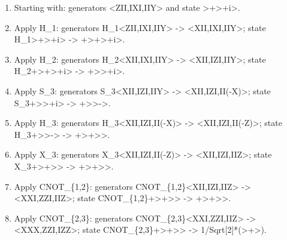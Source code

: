 \documentclass[11pt]{article}
\providecommand{\tightlist}{%
      \setlength{\itemsep}{0pt}\setlength{\parskip}{0pt}}
\begin{document}
    \begin{enumerate}
\def\labelenumi{\arabic{enumi}.}
\tightlist
\item
  Starting with: generators \textless ZII,IXI,IIY\textgreater{} and
  state
  \textgreater\textbar+\textgreater\textbar+i\textgreater.
\item
  Apply H\_1: generators H\_1\textless ZII,IXI,IIY\textgreater{}
  -\textgreater{} \textless XII,IXI,IIY\textgreater; state
  H\_1\textgreater\textbar+\textgreater\textbar+i\textgreater{}
  -\textgreater{}
  \textbar+\textgreater\textbar+\textgreater\textbar+i\textgreater.
\item
  Apply H\_2: generators H\_2\textless XII,IXI,IIY\textgreater{}
  -\textgreater{} \textless XII,IZI,IIY\textgreater; state
  H\_2\textbar+\textgreater\textbar+\textgreater\textbar+i\textgreater{}
  -\textgreater{}
  \textbar+\textgreater{}\textgreater\textbar+i\textgreater.
\item
  Apply S\_3: generators S\_3\textless XII,IZI,IIY\textgreater{}
  -\textgreater{} \textless XII,IZI,II(-X)\textgreater; state
  S\_3\textbar+\textgreater{}\textgreater\textbar+i\textgreater{}
  -\textgreater{}
  \textbar+\textgreater{}\textgreater\textbar-\textgreater.
\item
  Apply H\_3: generators H\_3\textless XII,IZI,II(-X)\textgreater{}
  -\textgreater{} \textless XII,IZI,II(-Z)\textgreater; state
  H\_3\textbar+\textgreater{}\textgreater\textbar-\textgreater{}
  -\textgreater{}
  \textbar+\textgreater\textbar+\textgreater{}\textgreater.
\item
  Apply X\_3: generators X\_3\textless XII,IZI,II(-Z)\textgreater{}
  -\textgreater{} \textless XII,IZI,IIZ\textgreater; state
  X\_3\textbar+\textgreater\textbar+\textgreater{}\textgreater{}
  -\textgreater{}
  \textbar+\textgreater\textbar+\textgreater{}\textgreater.
\item
  Apply CNOT\_\{1,2\}: generators
  CNOT\_\{1,2\}\textless XII,IZI,IIZ\textgreater{} -\textgreater{}
  \textless XXI,ZZI,IIZ\textgreater; state
  CNOT\_\{1,2\}\textbar+\textgreater\textbar+\textgreater{}\textgreater{}
  -\textgreater{}
  \textbar+\textgreater\textbar+\textgreater{}\textgreater.
\item
  Apply CNOT\_\{2,3\}: generators
  CNOT\_\{2,3\}\textless XXI,ZZI,IIZ\textgreater{} -\textgreater{}
  \textless XXX,ZZI,IZZ\textgreater; state
  CNOT\_\{2,3\}\textbar+\textgreater\textbar+\textgreater{}\textgreater{}
  -\textgreater{}
  1/Sqrt{[}2{]}*(\textgreater+\textgreater).
\end{enumerate}
\end{document}
